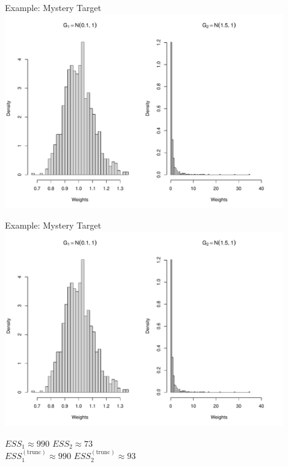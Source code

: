 \documentclass[14pt]{beamer}
\begin{document}
\begin{frame}{Example: Mystery Target}
    \centering
    \includegraphics[height=0.9\textheight, width=0.9\textwidth, keepaspectratio]{Figures/Wt Hist - Trunc.pdf}
\end{frame}

\begin{frame}{Example: Mystery Target}
    \centering
    \includegraphics[height=0.7\textheight, width=0.9\textwidth, keepaspectratio]{Figures/Wt Hist - Trunc.pdf} \newline
    \begin{outline}
        $ESS_1 \approx 990$ \hspace{2.5cm} $ESS_2 \approx 73$\\
        $ESS_1^{(\mathrm{trunc})} \approx 990$ \hspace{2.5cm} $ESS_2^{(\mathrm{trunc})} \approx 93$
    \end{outline}
\end{frame}
\end{document}
